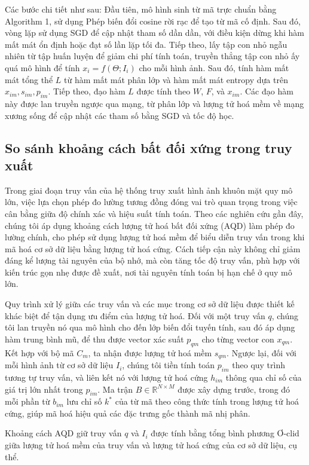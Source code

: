 Các bước chi tiết như sau:
Đầu tiên, mô hình sinh từ mã trực chuẩn bằng Algorithm 1, sử dụng Phép biến đổi cosine rời rạc để tạo từ mã cố định. Sau đó, vòng lặp sử dụng SGD để cập nhật tham số dần dần, với điều kiện dừng khi hàm mất mát ổn định hoặc đạt số lần lặp tối đa. Tiếp theo, lấy tập con nhỏ ngẫu nhiên từ tập huấn luyện để giảm chi phí tính toán, truyền thẳng tập con nhỏ ấy quá mô hình để tính $x_i = f(\Theta; I_i)$ cho mỗi hình ảnh. 
Sau đó, tính hàm mất mát tổng thể $L$ từ hàm mất mát phân lớp và hàm mất mát entropy dựa trên $x_{im}, s_{im}, p_{im}$. Tiếp theo, đạo hàm $L$ được tính theo $ W $, $ F $, và $ x_{im} $. Các đạo hàm này được lan truyền ngược qua mạng, từ phân lớp và lượng tử hoá mềm về mạng xương sống để cập nhật các tham số bằng SGD và tốc độ học.

\subsection{So sánh khoảng cách bất đối xứng trong truy xuất}
Trong giai đoạn truy vấn của hệ thống truy xuất hình ảnh khuôn mặt quy mô lớn, việc lựa chọn phép đo lường tương đồng đóng vai trò quan trọng trong việc cân bằng giữa độ chính xác và hiệu suất tính toán. Theo các nghiên cứu gần đây, chúng tôi áp dụng khoảng cách lượng tử hoá bất đối xứng (AQD) làm phép đo lường chính, cho phép sử dụng lượng tử hoá mềm để biểu diễn truy vấn trong khi mã hoá cơ sở dữ liệu bằng lượng tử hoá cứng. Cách tiếp cận này không chỉ giảm đáng kể lượng tài nguyên của bộ nhớ, mà còn tăng tốc độ truy vấn, phù hợp với kiến trúc gọn nhẹ được đề xuất, nơi tài nguyên tính toán bị hạn chế ở quy mô lớn.

Quy trình xử lý giữa các truy vấn và các mục trong cơ sở dữ liệu được thiết kế khác biệt để tận dụng ưu điểm của lượng tử hoá. Đối với một truy vấn $q$, chúng tôi lan truyền nó qua mô hình cho đến lớp biến đổi tuyến tính, sau đó áp dụng hàm trung bình mũ, để thu được vector xác suất $p_{qm}$ cho từng vector con $x_{qm}$. Kết hợp với bộ mã $C_m$, ta nhận được lượng tử hoá mềm $s_{qm}$. Ngược lại, đối với mỗi hình ảnh từ cơ sở dữ liệu $I_i$, chúng tôi tiền tính toán {$p_{im}$} theo quy trình tương tự truy vấn, và liên kết nó với lượng tử hoá cứng {$h_{im}$} thông qua chỉ số của giá trị lớn nhất trong {$p_{im}$}. Ma trận $B \in \mathbb{R}^{N \times M}$ được xây dựng trước, trong đó mỗi phần từ $b_{im}$ lưu chỉ số $k^*$ của từ mã theo công thức tính trong lượng tử hoá cứng, giúp mã hoá hiệu quả các đặc trưng gốc thành mã nhị phân.

Khoảng cách AQD giữ truy vấn $q$ và $I_i$ được tính bằng tổng bình phương Ơ-clid giữa lượng tử hoá mềm của truy vấn và lượng tử hoá cứng của cơ sở dữ liệu, cụ thể. 

